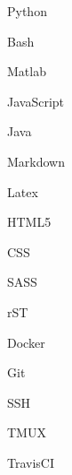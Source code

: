 
    \begin{cvskills}{4}{1}
                {\faCode}   %
                {           %
                    \begin{cvitems}
                        \item {Python}
                        \item {Bash}
                        \item {Matlab}
                        \item {JavaScript}
                        \item {Java}
                    \end{cvitems}
                }
                {\faMarkdown}   %
                {               %
                    \begin{cvitems}
                        \item {Markdown}
                        \item {Latex}
                        \item {HTML5}
                        \item {CSS}
                        \item {SASS}
                        \item {rST}
                    \end{cvitems}
                }
                {\faDocker}     %
                {               %
                    \begin{cvitems}
                        \item {Docker}
                        \item {Git}
                        \item {SSH}
                        \item {TMUX}
                        \item {TravisCI}
                    \end{cvitems}
                }
    \end{cvskills}

